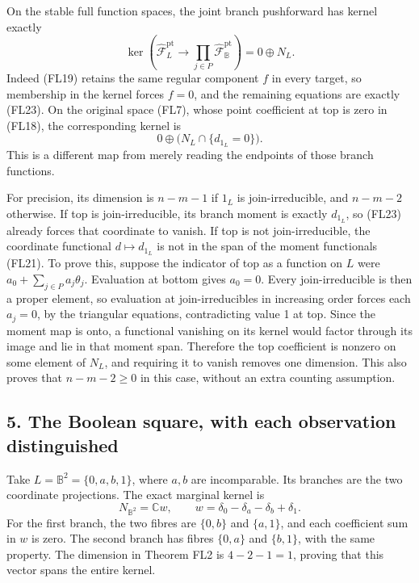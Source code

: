 \documentclass[
  10pt,
]{article}
\begin{document}
On the stable full function spaces, the joint branch pushforward has
kernel exactly \[
\ker\left(\widehat{\mathcal F}_L^{\mathrm{pt}}
\longrightarrow\prod_{j\in P}\widehat{\mathcal F}_{\mathbb B}^{\mathrm{pt}}\right)
=0\oplus N_L.
\tag{FL25}
\] Indeed (FL19) retains the same regular component \(f\) in every
target, so membership in the kernel forces \(f=0\), and the remaining
equations are exactly (FL23). On the original space (FL7), whose point
coefficient at top is zero in (FL18), the corresponding kernel is \[
0\oplus\bigl(N_L\cap\{d_{1_L}=0\}\bigr).
\tag{FL26}
\] This is a different map from merely reading the endpoints of those
branch functions.

For precision, its dimension is \(n-m-1\) if \(1_L\) is
join-irreducible, and \(n-m-2\) otherwise. If top is join-irreducible,
its branch moment is exactly \(d_{1_L}\), so (FL23) already forces that
coordinate to vanish. If top is not join-irreducible, the coordinate
functional \(d\mapsto d_{1_L}\) is not in the span of the moment
functionals (FL21). To prove this, suppose the indicator of top as a
function on \(L\) were \(a_0+\sum_{j\in P}a_j\theta_j\). Evaluation at
bottom gives \(a_0=0\). Every join-irreducible is then a proper element,
so evaluation at join-irreducibles in increasing order forces each
\(a_j=0\), by the triangular equations, contradicting value 1 at top.
Since the moment map is onto, a functional vanishing on its kernel would
factor through its image and lie in that moment span. Therefore the top
coefficient is nonzero on some element of \(N_L\), and requiring it to
vanish removes one dimension. This also proves that \(n-m-2\ge0\) in
this case, without an extra counting assumption.

\subsection{5. The Boolean square, with each observation
distinguished}\label{the-boolean-square-with-each-observation-distinguished}

Take \(L=\mathbb B^2=\{0,a,b,1\}\), where \(a,b\) are incomparable. Its
branches are the two coordinate projections. The exact marginal kernel
is \[
N_{\mathbb B^2}=\mathbb C w,
\qquad
w=\delta_0-\delta_a-\delta_b+\delta_1.
\tag{FL27}
\] For the first branch, the two fibres are \(\{0,b\}\) and \(\{a,1\}\),
and each coefficient sum in \(w\) is zero. The second branch has fibres
\(\{0,a\}\) and \(\{b,1\}\), with the same property. The dimension in
Theorem FL2 is \(4-2-1=1\), proving that this vector spans the entire
kernel.
\end{document}
